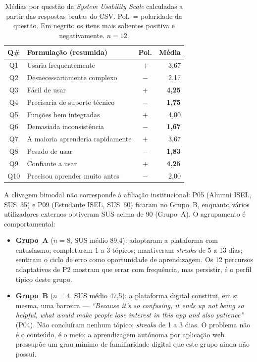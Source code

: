 \begin{table}[htbp]
	\centering
	\small
	\begin{tabular}{c p{6.5cm} c r}
		\toprule
		\textbf{Q\#} & \textbf{Formulação (resumida)} & \textbf{Pol.} & \textbf{Média} \\
		\midrule
		Q1  & Usaria frequentemente                 & $+$ & 3,67 \\
		Q2  & Desnecessariamente complexo            & $-$ & 2,17 \\
		Q3  & Fácil de usar                         & $+$ & \textbf{4,25} \\
		Q4  & Precisaria de suporte técnico         & $-$ & \textbf{1,75} \\
		Q5  & Funções bem integradas                & $+$ & 4,00 \\
		Q6  & Demasiada inconsistência              & $-$ & \textbf{1,67} \\
		Q7  & A maioria aprenderia rapidamente      & $+$ & 3,67 \\
		Q8  & Pesado de usar                        & $-$ & \textbf{1,83} \\
		Q9  & Confiante a usar                      & $+$ & \textbf{4,25} \\
		Q10 & Precisou aprender muito antes         & $-$ & 2,00 \\
		\bottomrule
	\end{tabular}
	\caption[Médias por questão da SUS calculadas a partir dos dados brutos do CSV ($n=12$)]{Médias por questão da \emph{System Usability Scale} calculadas a partir das respostas brutas do CSV. Pol.~= polaridade da questão. Em negrito os itens mais salientes positiva e negativamente. $n=12$.}
	\label{tab:sus-por-questao}
\end{table}

A clivagem bimodal não corresponde à afiliação institucional: P05 (Alumni ISEL, SUS~35) e P09 (Estudante ISEL, SUS~60) ficaram no Grupo~B, enquanto vários utilizadores externos obtiveram SUS acima de 90 (Grupo~A). O agrupamento é comportamental:

\begin{itemize}
	\item \textbf{Grupo~A} ($n=8$, SUS médio 89,4): adoptaram a plataforma com entusiasmo; completaram 1 a 3 tópicos; mantiveram \emph{streaks} de 5 a 13 dias; sentiram o ciclo de erro como oportunidade de aprendizagem. Os 12 percursos adaptativos de P2 mostram que errar com frequência, mas persistir, é o perfil típico deste grupo.
	\item \textbf{Grupo~B} ($n=4$, SUS médio 47,5): a plataforma digital constitui, em si mesma, uma barreira --- \emph{``Because it's so confusing, it ends up not being so helpful, what would make people lose interest in this app and also patience''} (P04). Não concluíram nenhum tópico; \emph{streaks} de 1 a 3 dias. O problema não é o conteúdo, é o meio: a aprendizagem autónoma por aplicação web pressupõe um grau mínimo de familiaridade digital que este grupo ainda não possui.
\end{itemize}

